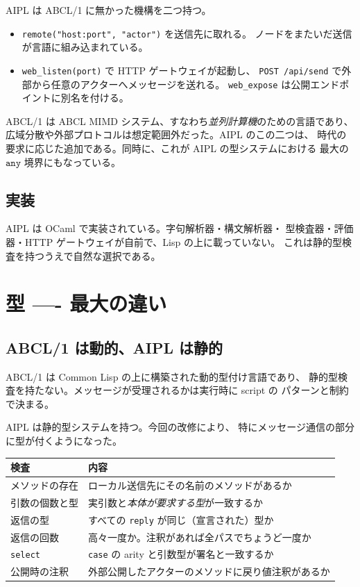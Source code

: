 \documentclass[11pt,a4paper]{ltjsarticle}
\theoremstyle{remark}
\newcommand{\ty}[1]{\ensuremath{\mathtt{#1}}}
\begin{document}
AIPL は ABCL/1 に無かった機構を二つ持つ。

\begin{itemize}
\item \texttt{remote("host:port", "actor")} を送信先に取れる。
  ノードをまたいだ送信が言語に組み込まれている。
\item \texttt{web\_listen(port)} で HTTP ゲートウェイが起動し、
  \texttt{POST /api/send} で外部から任意のアクターへメッセージを送れる。
  \texttt{web\_expose} は公開エンドポイントに別名を付ける。
\end{itemize}

ABCL/1 は ABCL MIMD システム、すなわち\emph{並列計算機}のための言語であり、
広域分散や外部プロトコルは想定範囲外だった。AIPL のこの二つは、
時代の要求に応じた追加である。同時に、これが AIPL の型システムにおける
最大の \ty{any} 境界にもなっている。

\subsection{実装}

AIPL は OCaml で実装されている。字句解析器・構文解析器・
型検査器・評価器・HTTP ゲートウェイが自前で、Lisp の上に載っていない。
これは静的型検査を持つうえで自然な選択である。

\section{型 ---- 最大の違い}
\label{sec:types}

\subsection{ABCL/1 は動的、AIPL は静的}

ABCL/1 は Common Lisp の上に構築された動的型付け言語であり、
静的型検査を持たない。メッセージが受理されるかは実行時に script の
パターンと制約で決まる。

AIPL は静的型システムを持つ。今回の改修により、
特にメッセージ通信の部分に型が付くようになった。

\begin{center}
\small
\begin{tabular}{@{}lp{9.2cm}@{}}
\toprule
検査 & 内容 \\
\midrule
メソッドの存在 & ローカル送信先にその名前のメソッドがあるか \\
引数の個数と型 & 実引数と\emph{本体が要求する型}が一致するか \\
返信の型       & すべての \texttt{reply} が同じ（宣言された）型か \\
返信の回数     & 高々一度か。注釈があれば全パスでちょうど一度か \\
\texttt{select} & \texttt{case} の arity と引数型が署名と一致するか \\
公開時の注釈   & 外部公開したアクターのメソッドに戻り値注釈があるか \\
\bottomrule
\end{tabular}
\end{center}
\end{document}
